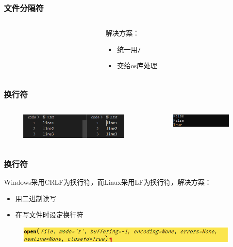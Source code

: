 \documentclass[hyperref={pdfpagelabels=false}]{beamer}
\begin{document}
\begin{frame}
	\frametitle{文件分隔符}
	\begin{columns}
		\begin{column}{.5\linewidth}
			
		\end{column}
	
		\begin{column}{.5\linewidth}
			解决方案：
			\begin{itemize}
				\item 统一用\texttt{/}
				\item 交给os库处理
			\end{itemize}
		\end{column}
	\end{columns}
\end{frame}

\begin{frame}
	\frametitle{换行符}
	\begin{columns}
		\begin{column}{.5\linewidth}
			
			\begin{figure}
				\centering
				\includegraphics[width=\textwidth]{./figure/1.png}
			\end{figure}
		\end{column}
		\pause
		\begin{column}{.5\linewidth}
			\begin{figure}
				\centering
				\includegraphics[width=\textwidth]{./figure/2.png}
			\end{figure}
		\end{column}
	\end{columns}
\end{frame}

\begin{frame}
	\frametitle{换行符}
	Windows采用CRLF为换行符，而Linux采用LF为换行符，解决方案：
	\begin{itemize}
		\item 用二进制读写
		\item 在写文件时设定换行符
	\end{itemize}
	\begin{figure}
		\centering
		\includegraphics[width=\textwidth]{./figure/3.png}
	\end{figure}
\end{frame}
\end{document}
